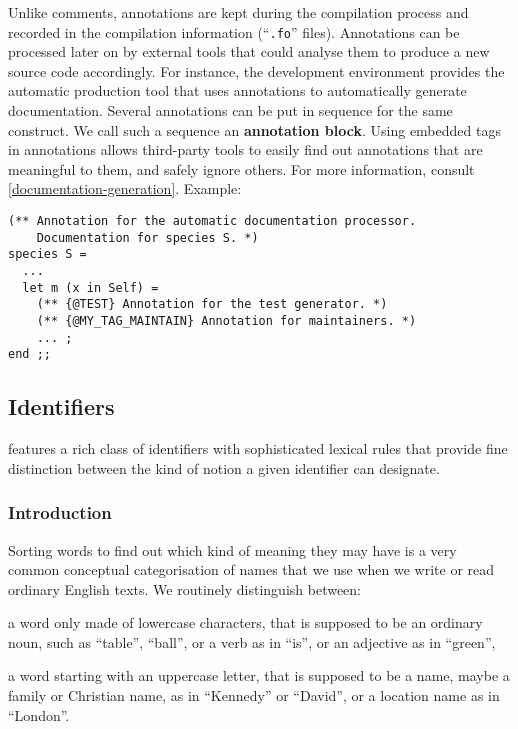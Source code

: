 Unlike comments, annotations are kept during the compilation process
and recorded in the compilation information (``{\tt .fo}'' files). Annotations can
be processed later on by external tools that could analyse them to
produce a new {\focal} source code accordingly.
For instance, the {\focal} development environment provides the {\focdoc}
automatic production tool that uses annotations to automatically generate
documentation.
Several annotations can be put in sequence for the same construct. We call
such a sequence an {\bf annotation block}.
Using embedded tags in annotations allows third-party tools to easily find
out annotations that are meaningful to them, and safely ignore others.
For more information, consult
\ref{documentation-generation}.
Example:
{\scriptsize
\begin{lstlisting}
(** Annotation for the automatic documentation processor.
    Documentation for species S. *)
species S =
  ...
  let m (x in Self) =
    (** {@TEST} Annotation for the test generator. *)
    (** {@MY_TAG_MAINTAIN} Annotation for maintainers. *)
    ... ;
end ;;
\end{lstlisting}
}

\subsection{Identifiers}
\vspace{0.2cm}

{\focal} features a rich class of identifiers with sophisticated lexical
rules that provide fine distinction between the kind of notion a given
identifier can designate.

\subsubsection{Introduction}

Sorting words to find out which kind of meaning they may have is a very common
conceptual categorisation of names that we use when we write or read ordinary
English texts. We routinely distinguish between:
\begin{citemize}
\item a word only made of lowercase characters, that is supposed to be an
  ordinary noun, such as ``table'', ``ball'', or a verb as in ``is'', or an
  adjective as in ``green'',
\item a word starting with an uppercase letter, that is supposed to be a name,
  maybe a family or Christian name, as in ``Kennedy'' or ``David'', or a location
  name as in ``London''.
\end{citemize}

